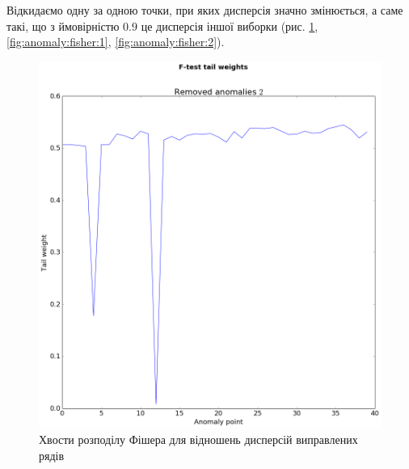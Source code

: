 Відкидаємо одну за одною точки, при яких дисперсія значно змінюється,
а саме такі, що з ймовірністю $0.9$ це дисперсія іншої виборки
(рис. \ref{fig:anomaly:fisher:0}, \ref{fig:anomaly:fisher:1},
\ref{fig:anomaly:fisher:2}).
\begin{figure}[h!]
  \centering
  \includegraphics[width=\textwidth]{Coursework_files/Coursework_18_0.png}
  \caption{Хвости розподілу Фішера для відношень дисперсій виправлених рядів}
  \label{fig:anomaly:fisher:0}
\end{figure}
